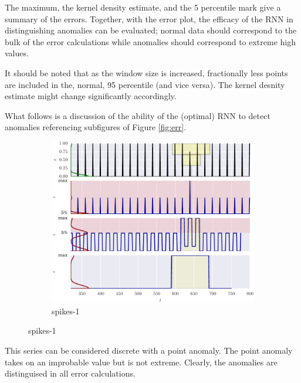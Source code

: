 The maximum, the kernel density estimate, and the 5 percentile mark give a summary of the errors.
%
Together, with the error plot, the efficacy of the RNN in distinguishing anomalies can be evaluated;
%
normal data should correspond to the bulk of the error calculations while anomalies should correspond to extreme high values.


It should be noted that as the window size is increased, fractionally less points are included in the, normal, 95 percentile (and vice versa).
%
The kernel desnity estimate might change significantly accordingly.


What follows is a discussion of the ability of the (optimal) RNN to detect anomalies referencing subfigures of Figure \ref{fig:err}.




\begin{figure}[!hp] %
    \centering
  
  \begin{subfigure}[t]{\textwidth}
        \centering
        \includegraphics[]{figs/er_spikelv.pdf}
        \caption{spikes-1}
    \end{subfigure}%

\end{figure}

This series can be considered discrete with a point anomaly.
%
The point anomaly takes on an improbable value but is not extreme.
%
Clearly, the anomalies are distinguised in all error calculations.


